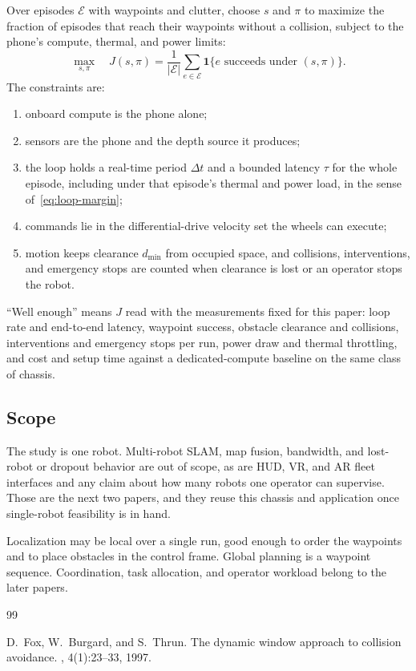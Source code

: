 \documentclass[11pt,a4paper]{article}
\begin{document}
Over episodes \(\mathcal{E}\) with waypoints and clutter, choose \(s\) and \(\pi\) to maximize the fraction of episodes that reach their waypoints without a collision, subject to the phone's compute, thermal, and power limits:
\begin{equation}
\label{eq:objective}
\max_{s,\pi}
\quad
J(s, \pi)
=
\frac{1}{|\mathcal{E}|}
\sum_{e \in \mathcal{E}}
\mathbf{1}\{e \text{ succeeds under } (s, \pi)\}.
\end{equation}
The constraints are:
\begin{enumerate}
\item onboard compute is the phone alone;
\item sensors are the phone and the depth source it produces;
\item the loop holds a real-time period \(\Delta t\) and a bounded latency \(\tau\) for the whole episode, including under that episode's thermal and power load, in the sense of~\eqref{eq:loop-margin};
\item commands lie in the differential-drive velocity set the wheels can execute;
\item motion keeps clearance \(d_{\min}\) from occupied space, and collisions, interventions, and emergency stops are counted when clearance is lost or an operator stops the robot.
\end{enumerate}

``Well enough'' means \(J\) read with the measurements fixed for this paper: loop rate and end-to-end latency, waypoint success, obstacle clearance and collisions, interventions and emergency stops per run, power draw and thermal throttling, and cost and setup time against a dedicated-compute baseline on the same class of chassis.

\subsection{Scope}
\label{sec:scope}

The study is one robot.
Multi-robot SLAM, map fusion, bandwidth, and lost-robot or dropout behavior are out of scope, as are HUD, VR, and AR fleet interfaces and any claim about how many robots one operator can supervise.
Those are the next two papers, and they reuse this chassis and application once single-robot feasibility is in hand.

Localization may be local over a single run, good enough to order the waypoints and to place obstacles in the control frame.
Global planning is a waypoint sequence.
Coordination, task allocation, and operator workload belong to the later papers.


\begin{thebibliography}{99}

D.~Fox, W.~Burgard, and S.~Thrun.
\newblock The dynamic window approach to collision avoidance.
, 4(1):23--33, 1997.

\end{thebibliography}
\end{document}
